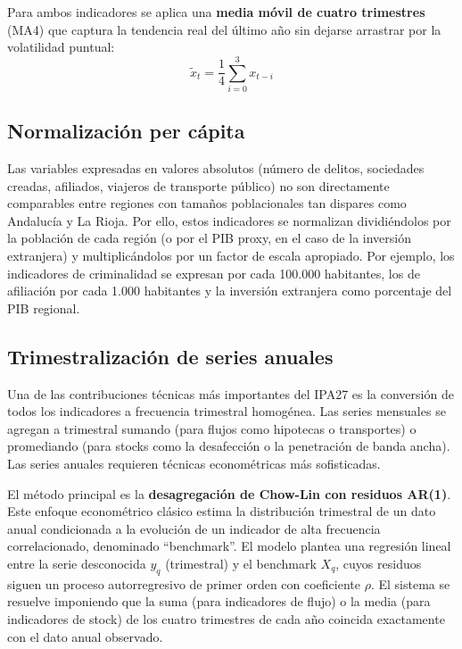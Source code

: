 \documentclass[12pt,a4paper]{article}
\begin{document}
Para ambos indicadores se aplica una \textbf{media móvil de cuatro trimestres} (MA4) que captura la tendencia real del último año sin dejarse arrastrar por la volatilidad puntual:
\begin{equation}
\tilde{x}_t = \frac{1}{4} \sum_{i=0}^{3} x_{t-i}
\end{equation}

\subsection{Normalización per cápita}

Las variables expresadas en valores absolutos (número de delitos, sociedades creadas, afiliados, viajeros de transporte público) no son directamente comparables entre regiones con tamaños poblacionales tan dispares como Andalucía y La Rioja. Por ello, estos indicadores se normalizan dividiéndolos por la población de cada región (o por el PIB proxy, en el caso de la inversión extranjera) y multiplicándolos por un factor de escala apropiado. Por ejemplo, los indicadores de criminalidad se expresan por cada 100.000 habitantes, los de afiliación por cada 1.000 habitantes y la inversión extranjera como porcentaje del PIB regional.

\subsection{Trimestralización de series anuales}

Una de las contribuciones técnicas más importantes del IPA27 es la conversión de todos los indicadores a frecuencia trimestral homogénea. Las series mensuales se agregan a trimestral sumando (para flujos como hipotecas o transportes) o promediando (para stocks como la desafección o la penetración de banda ancha). Las series anuales requieren técnicas econométricas más sofisticadas.

El método principal es la \textbf{desagregación de Chow-Lin con residuos AR(1)}. Este enfoque econométrico clásico estima la distribución trimestral de un dato anual condicionada a la evolución de un indicador de alta frecuencia correlacionado, denominado ``benchmark''. El modelo plantea una regresión lineal entre la serie desconocida $y_q$ (trimestral) y el benchmark $X_q$, cuyos residuos siguen un proceso autorregresivo de primer orden con coeficiente $\rho$. El sistema se resuelve imponiendo que la suma (para indicadores de flujo) o la media (para indicadores de stock) de los cuatro trimestres de cada año coincida exactamente con el dato anual observado.
\end{document}
